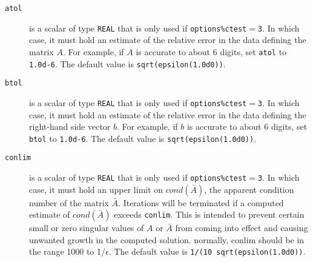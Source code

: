 \begin{description}




\item[\texttt{atol}] is a scalar of type {\tt REAL} that is only used if {\tt options\%ctest}$ =${\tt 3}.
    In which case, it must hold an estimate of the relative error in the data
    defining the matrix $A$.  For example, if $A$ is accurate to about 6 digits,
    set {\tt atol} to {\tt 1.0d-6}. The default value is {\tt sqrt(epsilon(1.0d0))}.

\item[\texttt{btol}] is a scalar of type {\tt REAL} that is only used if {\tt options\%ctest}$ =${\tt 3}.
     In which case, it must hold an estimate of the relative error in the data
    defining the right-hand side vector $ b$.  For example, if $b$ is
    accurate to about 6 digits, set {\tt btol} to {\tt 1.0d-6}. The default value is 
    {\tt sqrt(epsilon(1.0d0))}.


\item[\texttt{conlim}] is a scalar of type {\tt REAL} that is only used if {\tt options\%ctest}$ =${\tt 3}.
     In which case, it must hold an upper limit on $cond(\bar{A})$, the apparent
     condition number of the matrix $\bar{A}$. Iterations will be terminated 
     if a computed estimate of $cond(\bar{A})$ exceeds {\tt conlim}.
     This is intended to prevent certain small or
     zero singular values of $A$ or $\bar{A}$ from
     coming into effect and causing unwanted growth in the computed solution.
     normally, conlim should be in the range 1000 to 1/$\epsilon$.
     The default value is {\tt 1/(10 sqrt(epsilon(1.0d0))}.


\end{description}
